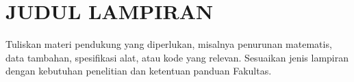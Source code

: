 \documentclass[skripsi]{ugmskripsi}
\begin{document}


\appendix
\chapter{JUDUL LAMPIRAN}
Tuliskan materi pendukung yang diperlukan, misalnya penurunan matematis,
data tambahan, spesifikasi alat, atau kode yang relevan. Sesuaikan jenis
lampiran dengan kebutuhan penelitian dan ketentuan panduan Fakultas.

\end{document}
